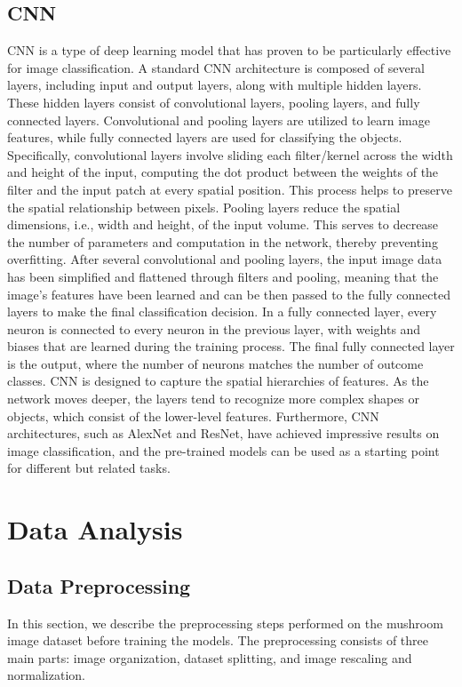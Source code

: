 \documentclass{article}
\begin{document}
\subsection{CNN}
CNN is a type of deep learning model that has proven to be particularly effective for image classification. A standard CNN architecture is composed of several layers, including input and output layers, along with multiple hidden layers. These hidden layers consist of convolutional layers, pooling layers, and fully connected layers. Convolutional and pooling layers are utilized to learn image features, while fully connected layers are used for classifying the objects. Specifically, convolutional layers involve sliding each filter/kernel across the width and height of the input, computing the dot product between the weights of the filter and the input patch at every spatial position. This process helps to preserve the spatial relationship between pixels. Pooling layers reduce the spatial dimensions, i.e., width and height, of the input volume. This serves to decrease the number of parameters and computation in the network, thereby preventing overfitting. After several convolutional and pooling layers, the input image data has been simplified and flattened through filters and pooling, meaning that the image’s features have been learned and can be then passed to the fully connected layers to make the final classification decision. In a fully connected layer, every neuron is connected to every neuron in the previous layer, with weights and biases that are learned during the training process. The final fully connected layer is the output, where the number of neurons matches the number of outcome classes. CNN is designed to capture the spatial hierarchies of features. As the network moves deeper, the layers tend to recognize more complex shapes or objects, which consist of the lower-level features. Furthermore, CNN architectures, such as AlexNet and ResNet, have achieved impressive results on image classification, and the pre-trained models can be used as a starting point for different but related tasks.

\section{Data Analysis}
\subsection{Data Preprocessing}
In this section, we describe the preprocessing steps performed on the mushroom image dataset before training the models. The preprocessing consists of three main parts: image organization, dataset splitting, and image rescaling and normalization.
\end{document}
